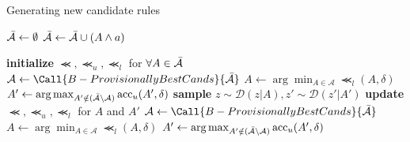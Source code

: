 \documentclass[aspectratio=169]{slide-en}
\begin{document}
\begin{frame}
  \begin{algorithm}[H]
    \caption{Generating new candidate rules}
    \begin{algorithmic}[1]
      \State$\bar{\mathcal{A}}\gets\emptyset$
      \State$\bar{\mathcal{A}}\gets\bar{\mathcal{A}}\cup(A\wedge a)$
      \EndFor%
      \EndFor%
      \State\Return{$\cands$}
      \EndFunction%
    \end{algorithmic}
  \end{algorithm}
\end{frame}

\begin{frame}
  \begin{algorithm}[H]
    \small
    \caption{%
      Searching rules with highest accuracy (KL-LUCB~\cite{kaufmann2013information})
    }
    \begin{algorithmic}[1]
      \State\textbf{initialize} $\Prec,\Prec_{u},\Prec_{l}$ for $\forall A\in\bar{\mathcal{A}}$
      \State$\mathcal{A}\gets\Call{B-ProvisionallyBestCands}{\cands}$
      \State$A\gets\arg\min_{A\in\mathcal{A}}\Prec_{l}(A,\delta)$
      \State$A'\gets\arg\max_{A'\notin(\bar{\mathcal{A}}\setminus\mathcal{A})}\operatorname{acc}_{u}(A',\delta)$
      \State\textbf{sample} $z\sim\mathcal{D}(z|A),z'\sim\mathcal{D}(z'|A')$
      \State\textbf{update} $\Prec,\Prec_{u},\Prec_{l}$ for $A$ and $A'$
      \State$\mathcal{A}\gets\Call{B-ProvisionallyBestCands}{\cands}$
      \State$A\gets\arg\min_{A\in\mathcal{A}}\Prec_{l}(A,\delta)$
      \State$A'\gets\arg\max_{A'\notin(\bar{\mathcal{A}}\setminus\mathcal{A})}\operatorname{acc}_{u}(A',\delta)$
      \EndWhile%
      \State{}
      \EndFunction%
    \end{algorithmic}
  \end{algorithm}
\end{frame}
\end{document}
